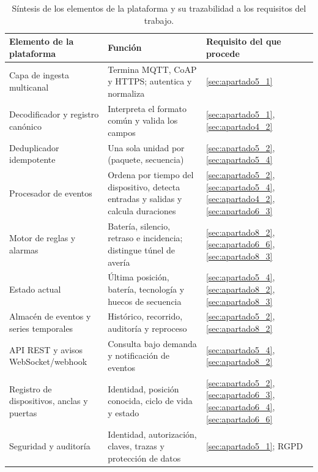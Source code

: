 \documentclass[11pt,a4paper]{article}
\begin{document}
\begin{table}[H]
    \centering
    \footnotesize
    \renewcommand{\arraystretch}{1.15}
    \begin{tabular}{@{}L{4.9cm}L{6.7cm}L{3.5cm}@{}}
        \toprule
        \textbf{Elemento de la plataforma} & \textbf{Función} & \textbf{Requisito del que procede} \\
        \midrule
        Capa de ingesta multicanal & Termina MQTT, CoAP y HTTPS; autentica y normaliza & \ref{sec:apartado5_1} \\
        Decodificador y registro canónico & Interpreta el formato común y valida los campos & \ref{sec:apartado5_1}, \ref{sec:apartado4_2} \\
        Deduplicador idempotente & Una sola unidad por (paquete, secuencia) & \ref{sec:apartado5_2}, \ref{sec:apartado5_4} \\
        Procesador de eventos & Ordena por tiempo del dispositivo, detecta entradas y salidas y calcula duraciones & \ref{sec:apartado5_2}, \ref{sec:apartado5_4}, \ref{sec:apartado4_2}, \ref{sec:apartado6_3} \\
        Motor de reglas y alarmas & Batería, silencio, retraso e incidencia; distingue túnel de avería & \ref{sec:apartado8_2}, \ref{sec:apartado6_6}, \ref{sec:apartado8_3} \\
        Estado actual & Última posición, batería, tecnología y huecos de secuencia & \ref{sec:apartado5_4}, \ref{sec:apartado8_2}, \ref{sec:apartado8_3} \\
        Almacén de eventos y series temporales & Histórico, recorrido, auditoría y reproceso & \ref{sec:apartado5_2}, \ref{sec:apartado8_2} \\
        API REST y avisos WebSocket/webhook & Consulta bajo demanda y notificación de eventos & \ref{sec:apartado5_4}, \ref{sec:apartado8_2} \\
        Registro de dispositivos, anclas y puertas & Identidad, posición conocida, ciclo de vida y estado & \ref{sec:apartado5_2}, \ref{sec:apartado6_3}, \ref{sec:apartado6_4}, \ref{sec:apartado6_6} \\
        Seguridad y auditoría & Identidad, autorización, claves, trazas y protección de datos & \ref{sec:apartado5_1}; RGPD~\cite{ref45} \\
        \bottomrule
    \end{tabular}
    \caption{Síntesis de los elementos de la plataforma y su trazabilidad a los requisitos del trabajo.}
    \label{tab:sintesis_plataforma}
\end{table}
\end{document}
